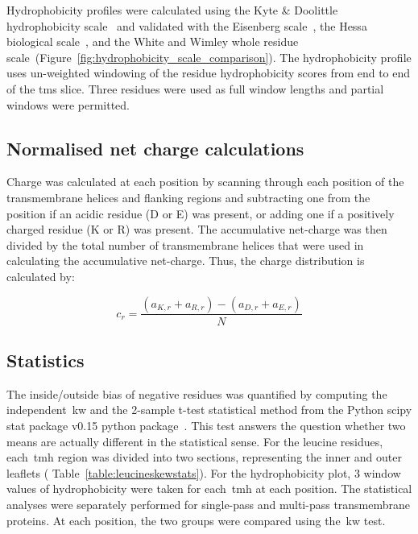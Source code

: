 Hydrophobicity profiles were calculated using the Kyte \& Doolittle hydrophobicity scale~\cite{Kyte1982} and validated with the Eisenberg scale~\cite{Eisenberg1984}, the Hessa biological scale~\cite{Hessa2005}, and the White and Wimley whole residue scale~\cite{White1999}(Figure~\ref{fig:hydrophobicity_scale_comparison}).
The hydrophobicity profile uses un-weighted windowing of the residue hydrophobicity scores from end to end of the \gls{tms} slice.
Three residues were used as full window lengths and partial windows were permitted.

\subsection{Normalised net charge calculations}

Charge was calculated at each position by scanning through each position of the transmembrane helices and flanking regions and subtracting one from the position if an acidic residue (D or E) was present, or adding one if a positively charged residue (K or R) was present.
The accumulative net-charge  was then divided by the total number  of transmembrane helices that were used in calculating the accumulative net-charge.
Thus, the charge distribution is calculated by:

\begin{equation} \label{eq:charge_equation}
c_r=\frac{(a_{K,r}+a_{R,r})-(a_{D,r}+a_{E,r})}{N}
\end{equation}

\subsection{Statistics}

The inside/outside bias of negative residues was quantified by computing the independent~\gls{kw} and the 2-sample t-test statistical method from the Python scipy stat package v0.15 python package~\cite{VanderWalt2011}.
This test answers the question whether two means are actually different in the statistical sense.
For the leucine residues, each~\gls{tmh} region was divided into two sections, representing the inner and outer leaflets ( Table~\ref{table:leucineskewstats}).
 For the hydrophobicity plot, 3 window values of hydrophobicity were taken for each~\gls{tmh} at each position.
The statistical analyses were separately performed for single-pass and multi-pass transmembrane proteins.
At each position, the two groups were compared using the~\gls{kw} test.

